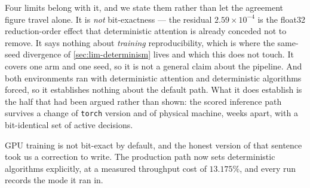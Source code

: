 Four limits belong with it, and we state them rather than let the agreement figure travel alone.
It is \emph{not} bit-exactness --- the residual $2.59\times10^{-4}$ is the float32
reduction-order effect that deterministic attention is already conceded not to remove. It says
nothing about \emph{training} reproducibility, which is where the same-seed divergence of
\cref{sec:lim-determinism} lives and which this does not touch. It covers one arm and one seed, so
it is not a general claim about the pipeline. And both environments ran with deterministic
attention and deterministic algorithms forced, so it establishes nothing about the default path.
What it does establish is the half that had been argued rather than shown: the scored inference
path survives a change of \texttt{torch} version and of physical machine, weeks apart, with a
bit-identical set of active decisions.

GPU training is not bit-exact by default, and the honest version of that sentence took us a
correction to write. The production path now sets deterministic algorithms explicitly, at a
measured throughput cost of $13.175\%$, and every run records the mode it ran in.

